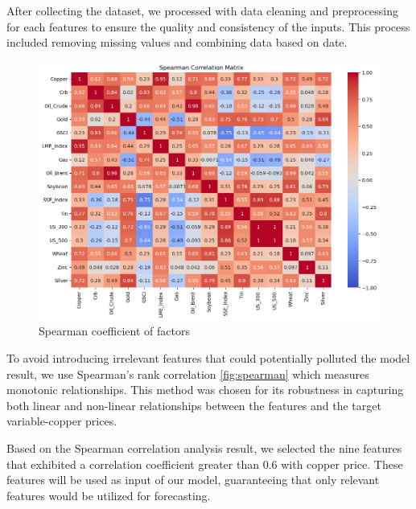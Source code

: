 \documentclass[final-report]{report-template}
\begin{document}
After collecting the dataset, we processed with data cleaning and preprocessing for each features to ensure the quality and consistency of the inputs. This process included removing missing values and combining data based on date.
\begin{figure}[h]
    \centering
    \includegraphics[width=1\linewidth]{figures/factors_spearman.png}
    \caption{Spearman coefficient of factors}
    \label{fig:spearman}
\end{figure}
To avoid introducing irrelevant features that could potentially polluted the model result,  we use Spearman's rank correlation \autoref{fig:spearman} which measures monotonic relationships.  This method was chosen for its robustness in capturing both linear and non-linear relationships between the features and the target variable-copper prices. 

Based on the Spearman correlation \cite{spearman2008} analysis result, we selected the nine features that exhibited a correlation coefficient greater than 0.6 with copper price. These features will be used as input of our model, guaranteeing that only relevant features would be utilized for forecasting.\cite{zhong2019time}
\end{document}
